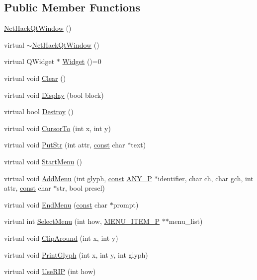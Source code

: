 \subsection*{Public Member Functions}
\begin{DoxyCompactItemize}
\item 
\hyperlink{classNetHackQtWindow_a9efb47e43415973e6330b73f36085fe3}{Net\+Hack\+Qt\+Window} ()
\item 
virtual \hyperlink{classNetHackQtWindow_a883a1e50399740cf3a70138ef0b17049}{$\sim$\+Net\+Hack\+Qt\+Window} ()
\item 
virtual Q\+Widget $\ast$ \hyperlink{classNetHackQtWindow_a454ce97ef84b9c19e4ec168472875c5b}{Widget} ()=0
\item 
virtual void \hyperlink{classNetHackQtWindow_a6867478dfb55bb5815619222c01347e5}{Clear} ()
\item 
virtual void \hyperlink{classNetHackQtWindow_a21ff7dfdbb22cd641b8b483495d4821c}{Display} (bool block)
\item 
virtual bool \hyperlink{classNetHackQtWindow_ace12ede60b206bc16bd33e1b0a1534c1}{Destroy} ()
\item 
virtual void \hyperlink{classNetHackQtWindow_a40120118e501f99996b8ba7a3d891132}{Cursor\+To} (int x, int y)
\item 
virtual void \hyperlink{classNetHackQtWindow_af8d4a74697e969324bafc23de6057388}{Put\+Str} (int attr, \hyperlink{tradstdc_8h_a2c212835823e3c54a8ab6d95c652660e}{const} char $\ast$text)
\item 
virtual void \hyperlink{classNetHackQtWindow_a75fa773997c2d00328fa04107d6ef88f}{Start\+Menu} ()
\item 
virtual void \hyperlink{classNetHackQtWindow_ab76861e4e6b7593595c66757450a5d8c}{Add\+Menu} (int glyph, \hyperlink{tradstdc_8h_a2c212835823e3c54a8ab6d95c652660e}{const} \hyperlink{wintype_8h_ae29f750de92b8a7c2566957e5863fbed}{A\+N\+Y\+\_\+\+P} $\ast$identifier, char ch, char gch, int attr, \hyperlink{tradstdc_8h_a2c212835823e3c54a8ab6d95c652660e}{const} char $\ast$str, bool presel)
\item 
virtual void \hyperlink{classNetHackQtWindow_a8de6699043fa6fb03846dee1ca5b180b}{End\+Menu} (\hyperlink{tradstdc_8h_a2c212835823e3c54a8ab6d95c652660e}{const} char $\ast$prompt)
\item 
virtual int \hyperlink{classNetHackQtWindow_adb31a90e1a5ca19be017d5ac19dfd188}{Select\+Menu} (int how, \hyperlink{wintype_8h_a56b56557611b7f64f4e6585a1b78c8f9}{M\+E\+N\+U\+\_\+\+I\+T\+E\+M\+\_\+\+P} $\ast$$\ast$menu\+\_\+list)
\item 
virtual void \hyperlink{classNetHackQtWindow_aec6ca261ad0ec6782aeb3c02a5932810}{Clip\+Around} (int x, int y)
\item 
virtual void \hyperlink{classNetHackQtWindow_afc54f3a57eff0bf220c16b2efd0bc33a}{Print\+Glyph} (int x, int y, int glyph)
\item 
virtual void \hyperlink{classNetHackQtWindow_af382167a55fddfa62cd1537619341391}{Use\+R\+I\+P} (int how)
\end{DoxyCompactItemize}

